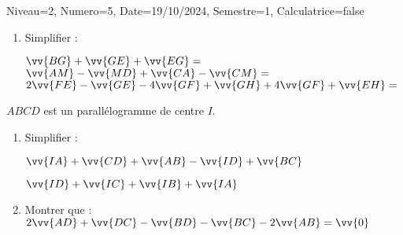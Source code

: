 \documentclass[a4paper,12pt]{article}
\begin{document}
\begin{Maquette}[DS]{Niveau=2, Numero=5, Date=19/10/2024, Semestre=1, Calculatrice=false}
\begin{exercice}
\begin{enumerate}
\item{} Simplifier :

\(\vv{BG}+\vv{GE}+\vv{EG}= \)\anserline[2]
\(\vv{AM}-\vv{MD}+\vv{CA}-\vv{CM}= \)\anserline[2]
\(2\vv{FE}-\vv{GE}-4\vv{GF}+\vv{GH}+4\vv{GF}+\vv{EH}= \)\anserline[2]
\end{enumerate}
\end{exercice}

\begin{exercice}
$ABCD$ est un parallélogramme de centre $I$.
\begin{enumerate}
\item{} Simplifier :
\begin{multicols}{2}
$\vv{IA}+\vv{CD}+\vv{AB}-\vv{ID}+\vv{BC}$

\anserline[5]
\columnbreak

$\vv{ID}+\vv{IC}+\vv{IB}+\vv{IA}$

\anserline[5]
\end{multicols}
\item{} Montrer que : $2\vv{AD}+\vv{DC}-\vv{BD}-\vv{BC}-2\vv{AB}=\vv{0}$

\anserline[10]
\end{enumerate}
\end{exercice}
\end{Maquette}
\end{document}
